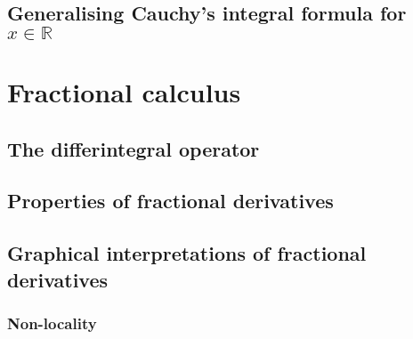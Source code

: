 \documentclass{article}
\begin{document}
\subsection{Generalising Cauchy's integral formula for $x \in \mathbb{R}$}

\section{Fractional calculus}
\subsection{The differintegral operator}
\subsection{Properties of fractional derivatives}
\subsection{Graphical interpretations of fractional derivatives}
\subsubsection{Non-locality}
\end{document}
